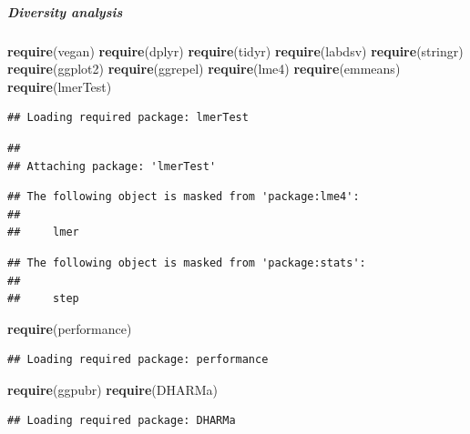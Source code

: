 \documentclass[
]{article}
\newenvironment{Shaded}{\begin{snugshade}}{\end{snugshade}}
\newcommand{\FunctionTok}[1]{\textcolor[rgb]{0.13,0.29,0.53}{\textbf{#1}}}
\newcommand{\NormalTok}[1]{#1}
\begin{document}
\hypertarget{diversity-analysis}{%
\subparagraph{Diversity analysis}\label{diversity-analysis}}

\begin{Shaded}
\begin{Highlighting}[]
\FunctionTok{require}\NormalTok{(vegan)}
\FunctionTok{require}\NormalTok{(dplyr)}
\FunctionTok{require}\NormalTok{(tidyr)}
\FunctionTok{require}\NormalTok{(labdsv)}
\FunctionTok{require}\NormalTok{(stringr)}
\FunctionTok{require}\NormalTok{(ggplot2)}
\FunctionTok{require}\NormalTok{(ggrepel)}
\FunctionTok{require}\NormalTok{(lme4)}
\FunctionTok{require}\NormalTok{(emmeans)}
\FunctionTok{require}\NormalTok{(lmerTest)}
\end{Highlighting}
\end{Shaded}

\begin{verbatim}
## Loading required package: lmerTest
\end{verbatim}

\begin{verbatim}
## 
## Attaching package: 'lmerTest'
\end{verbatim}

\begin{verbatim}
## The following object is masked from 'package:lme4':
## 
##     lmer
\end{verbatim}

\begin{verbatim}
## The following object is masked from 'package:stats':
## 
##     step
\end{verbatim}

\begin{Shaded}
\begin{Highlighting}[]
\FunctionTok{require}\NormalTok{(performance)}
\end{Highlighting}
\end{Shaded}

\begin{verbatim}
## Loading required package: performance
\end{verbatim}

\begin{Shaded}
\begin{Highlighting}[]
\FunctionTok{require}\NormalTok{(ggpubr)}
\FunctionTok{require}\NormalTok{(DHARMa)}
\end{Highlighting}
\end{Shaded}

\begin{verbatim}
## Loading required package: DHARMa
\end{verbatim}
\end{document}
